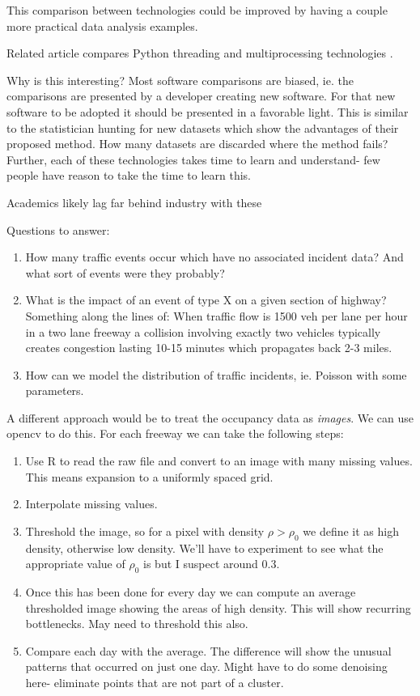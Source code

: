 \documentclass[12pt]{article}
\begin{document}
This comparison between technologies could be improved by having a couple
more practical data analysis examples.

Related article compares Python threading and multiprocessing
technologies \cite{malakhov2016composable}.

Why is this interesting? Most software comparisons are biased, ie. the
comparisons are presented by a developer creating new software. For that
new software to be adopted it should be presented in a favorable light. 
This is similar to the statistician hunting for new datasets which show the
advantages of their proposed method. How many datasets are discarded where
the method fails?
Further, each of these technologies takes time to learn and understand-
few people have reason to take the time to learn this.

Academics likely lag far behind industry with these

Questions to answer:
\begin{enumerate}
    \item How many traffic events occur which have no associated incident
        data? And what sort of events were they probably?
    \item What is the impact of an event of type X on a given section of
        highway? Something along the lines of: When traffic flow is 1500
        veh per lane per hour in a two lane freeway a collision involving
        exactly two vehicles typically creates congestion lasting 10-15
        minutes which propagates back 2-3 miles. 
    \item How can we model the distribution of traffic incidents, ie.
        Poisson with some parameters.
\end{enumerate}



A different approach would be to treat the occupancy data as \emph{images}.
We can use opencv to do this. For each freeway we can take the following
steps:
\begin{enumerate}
    \item Use R to read the raw file and convert to an image with many missing
        values. This means expansion to a uniformly spaced grid.
    \item Interpolate missing values. 
    \item Threshold the image, so for a pixel with density $\rho >
        \rho_0$
        we define it as high density, otherwise low density. We'll
        have to experiment to see what the appropriate value of $\rho_0$ is
        but I suspect around 0.3.
    \item Once this has been done for every day we can compute an average
        thresholded image showing the areas of high density. This will show
        recurring bottlenecks. May need to threshold this also.
    \item Compare each day with the average. The difference will show the
        unusual patterns that occurred on just one day. Might have to do
        some denoising here- eliminate points that are not part of a 
        cluster.
\end{enumerate}
\end{document}
